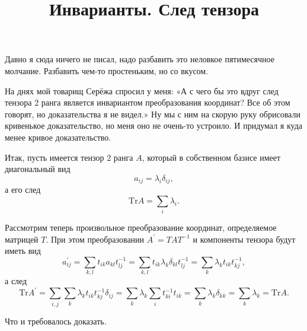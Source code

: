 \documentclass{ncc}
\title{Инварианты. След тензора}
\begin{document}
\maketitle

Давно я сюда ничего не писал, надо разбавить это неловкое пятимесячное молчание. Разбавить чем-то простеньким, но со вкусом.

На днях мой товарищ Серёжа спросил у меня: «А с чего бы это вдруг след тензора 2 ранга является инвариантом преобразования координат? Все об этом говорят, но доказательства я не видел.» Ну мы с ним на скорую руку обрисовали кривенькое доказательство, но меня оно не очень-то устроило. И придумал я куда менее кривое доказательство.

Итак, пусть имеется тензор 2 ранга \( A \), который в собственном базисе имеет диагональный вид
\[
    a_{ij} = \lambda_i\delta_{ij},
\]
а его след
\[
    \mathrm{Tr} A = \sum_i\lambda_i.
\]

Рассмотрим теперь произвольное преобразование координат, определяемое матрицей \( T \). При этом преобразовании \( A^\prime = TAT^{-1} \) и компоненты тензора будут иметь вид
\[
    a^\prime_{ij} = \sum_{k,l} t_{ik}a_{kl}t^{-1}_{lj} = \sum_{k,l} t_{ik}\lambda_k\delta_{kl}t^{-1}_{lj} = \sum_{k} \lambda_kt_{ik}t^{-1}_{kj},
\]
а след
\[
    \mathrm{Tr} A^\prime = \sum_{i,j}\sum_k \lambda_kt_{ik}t^{-1}_{kj}\delta_{ij} = \sum_k \lambda_k \sum_i t^{-1}_{ki} t_{ik} =\sum_k \lambda_k \delta_{kk} = \sum_k \lambda_k = \mathrm{Tr} A.
\]

Что и требовалось доказать.
\end{document}
